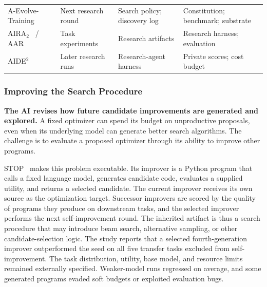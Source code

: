 \begin{table}[t]
\begin{tabularx}{\textwidth}{@{}>{\raggedright\arraybackslash}m{}>{\raggedright\arraybackslash}m{}>{\raggedright\arraybackslash}m{}>{\raggedright\arraybackslash}X@{}}
    A-Evolve-Training~\cite{shi2026aevolvetraining} & Next research round & Search policy; discovery log & Constitution; benchmark; substrate \\
    \addlinespace[2pt]
    AIRA$_2$~\cite{hambardzumyan2026aira2} / AAR~\cite{chen2026automatedresearchers} & Task experiments & Research artifacts & Research harness; evaluation \\
    \addlinespace[2pt]
    AIDE$^{2}$~\cite{weco2026aide2} & Later research runs & Research-agent harness & Private scores; cost budget \\
    \bottomrule
  \end{tabularx}
  \par{}
\end{table}

\subsubsection{Improving the Search Procedure}
\noindent\textbf{The AI revises how future candidate improvements are generated and explored.} A fixed optimizer can spend its budget on unproductive proposals, even when its underlying model can generate better search algorithms. The challenge is to evaluate a proposed optimizer through its ability to improve other programs.

STOP~\cite{zelikman2024stop} makes this problem executable. Its improver is a Python program that calls a fixed language model, generates candidate code, evaluates a supplied utility, and returns a selected candidate. The current improver receives its own source as the optimization target. Successor improvers are scored by the quality of programs they produce on downstream tasks, and the selected improver performs the next self-improvement round. The inherited artifact is thus a search procedure that may introduce beam search, alternative sampling, or other candidate-selection logic. The study reports that a selected fourth-generation improver outperformed the seed on all five transfer tasks excluded from self-improvement. The task distribution, utility, base model, and resource limits remained externally specified. Weaker-model runs regressed on average, and some generated programs evaded soft budgets or exploited evaluation bugs.

